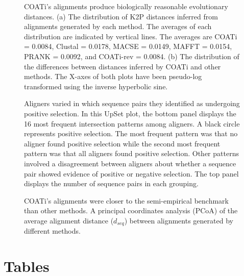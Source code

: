 \documentclass[12pt,letterpaper]{article}
\begin{document}
\begin{figure}[ht]
    \centering%
    \par
    \caption{COATi's alignments produce biologically reasonable evolutionary distances. (a) The distribution of K2P distances inferred from alignments generated by each method. The averages of each distribution are indicated by vertical lines. The averages are COATi = 0.0084, Clustal\textOmega{} = 0.0178, MACSE = 0.0149, MAFFT = 0.0154, PRANK = 0.0092, and COATi-rev = 0.0084. (b) The distribution of the differences between distances inferred by COATi and other methods. The X-axes of both plots have been pseudo-log transformed using the inverse hyperbolic sine.\label{fig:k2p-empirical}}
\end{figure}

\begin{figure}[ht]
    \centering%
    \par
    \caption{Aligners varied in which sequence pairs they identified as undergoing positive selection.
    In this UpSet plot, the bottom panel displays the 16 most frequent intersection patterns among aligners. A black circle represents positive selection. The most frequent pattern was that no aligner found positive selection while the second most frequent pattern was that all aligners found positive selection. Other patterns involved a disagreement between aligners about whether a sequence pair showed evidence of positive or negative selection. The top panel displays the number of sequence pairs in each grouping.\label{fig:sel-empirical}}
\end{figure}

\begin{figure}[ht]
    \centering%
    \par
    \caption{COATi's alignments were closer to the semi-empirical benchmark than other methods. A principal coordinates analysis (PCoA) of the average alignment distance ($d_{seq}$) between alignments generated by different methods.\label{fig:dseq-benchmarks}}
\end{figure}

\clearpage
\newpage
\section*{Tables}
\end{document}

